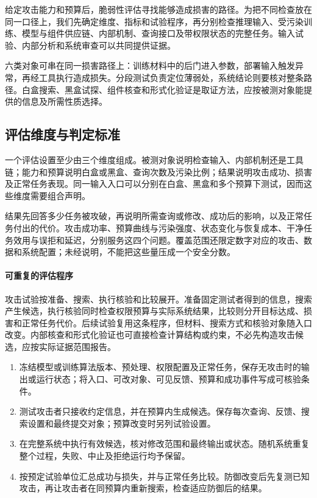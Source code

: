 给定攻击能力和预算后，脆弱性评估寻找能够造成损害的路径。为把不同检查放在同一口径上，我们先确定维度、指标和试验程序，再分别检查推理输入、受污染训练、模型与组件供应链、内部机制、查询接口及带权限状态的完整任务。输入试验、内部分析和系统审查可以共同提供证据。

六类对象可串在同一损害路径上：训练材料中的后门进入参数，部署输入触发异常，再经工具执行造成损失。分段测试负责定位薄弱处，系统结论则要核对整条路径。白盒搜索、黑盒试探、组件核查和形式化验证是取证方法，应按被测对象能提供的信息及所需性质选择。

\subsection{评估维度与判定标准}
\label{sec:security-risk-assessment}

一个评估设置至少由三个维度组成。被测对象说明检查输入、内部机制还是工具链；能力和预算说明白盒或黑盒、查询次数及污染比例；结果说明攻击成功、损害及正常任务表现。同一输入入口可以分别在白盒、黑盒和多个预算下测试，因而这些维度需要组合声明。

结果先回答多少任务被攻破，再说明所需查询或修改、成功后的影响，以及正常任务付出的代价。攻击成功率、预算曲线与污染强度、状态变化与恢复成本、干净任务效用与误拒和延迟，分别服务这四个问题。覆盖范围还限定数字对应的攻击、数据和系统配置；未经说明，不能把这些量压成一个安全分数。

\paragraph{可重复的评估程序}

攻击试验按准备、搜索、执行核验和比较展开。准备固定测试者得到的信息，搜索产生候选，执行核验同时检查权限预算与实际系统结果，比较则分开目标达成、损害和正常任务代价。后续试验复用这条程序，但材料、搜索方式和核验对象随入口改变。内部核查和形式化验证也可直接检查计算结构或约束，不必先构造攻击候选，应按实际证据范围报告。

\begin{enumerate}
 \item 冻结模型或训练算法版本、预处理、权限配置及正常任务，保存无攻击时的输出或运行状态；将入口、可改对象、可见反馈、预算和成功事件写成可核验条件。
 \item 测试攻击者只接收约定信息，并在预算内生成候选。保存每次查询、反馈、搜索设置和最终提交对象；预算改变时另列试验设置。
 \item 在完整系统中执行有效候选，核对修改范围和最终输出或状态。随机系统重复整个过程，失败、中止及拒绝运行均予保留。
 \item 按预定试验单位汇总成功与损失，并与正常任务比较。防御改变后先复测已知攻击，再让攻击者在同预算内重新搜索，检查适应防御后的结果。
\end{enumerate}


